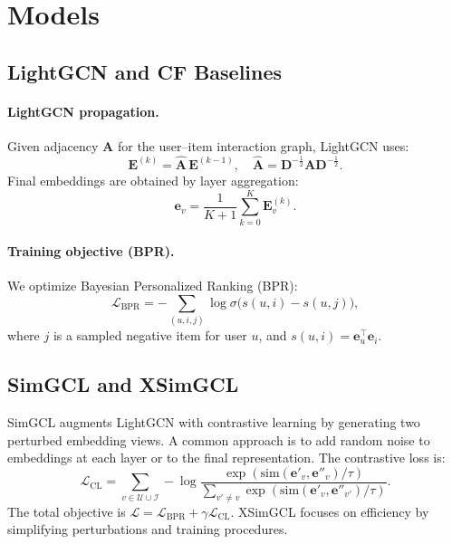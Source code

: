 \documentclass[11pt]{article}
\begin{document}
\section{Models}
\subsection{LightGCN and CF Baselines}
\paragraph{LightGCN propagation.}
Given adjacency \(\mathbf{A}\) for the user--item interaction graph, LightGCN uses:
\begin{equation}
\mathbf{E}^{(k)} = \hat{\mathbf{A}}\,\mathbf{E}^{(k-1)}, \quad
\hat{\mathbf{A}} = \mathbf{D}^{-\frac{1}{2}}\mathbf{A}\mathbf{D}^{-\frac{1}{2}}.
\label{eq:lightgcn}
\end{equation}
Final embeddings are obtained by layer aggregation:
\begin{equation}
\mathbf{e}_v = \frac{1}{K+1}\sum_{k=0}^{K}\mathbf{E}^{(k)}_v.
\end{equation}

\paragraph{Training objective (BPR).}
We optimize Bayesian Personalized Ranking (BPR):
\begin{equation}
\mathcal{L}_{\text{BPR}} = -\sum_{(u,i,j)}\log\sigma\big(s(u,i)-s(u,j)\big),
\label{eq:bpr}
\end{equation}
where \(j\) is a sampled negative item for user \(u\), and \(s(u,i)=\mathbf{e}_u^\top\mathbf{e}_i\).

\subsection{SimGCL and XSimGCL}
SimGCL augments LightGCN with contrastive learning by generating two perturbed embedding views. A common approach is to add random noise to embeddings at each layer or to the final representation. The contrastive loss is:
\begin{equation}
\mathcal{L}_{\text{CL}} = \sum_{v\in\mathcal{U}\cup\mathcal{I}} -\log \frac{\exp(\text{sim}(\mathbf{e}'_v,\mathbf{e}''_v)/\tau)}{\sum_{v'\neq v}\exp(\text{sim}(\mathbf{e}'_v,\mathbf{e}''_{v'})/\tau)}.
\label{eq:cl}
\end{equation}
The total objective is \(\mathcal{L}=\mathcal{L}_{\text{BPR}}+\gamma\mathcal{L}_{\text{CL}}\). XSimGCL focuses on efficiency by simplifying perturbations and training procedures.
\end{document}
